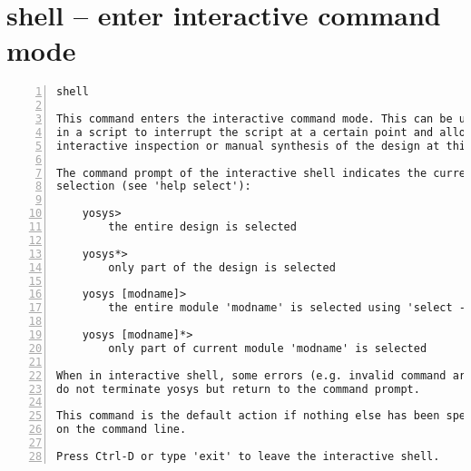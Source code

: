 \section{shell -- enter interactive command mode}
\label{cmd:shell}
\begin{lstlisting}[numbers=left,frame=single]
    shell

This command enters the interactive command mode. This can be useful
in a script to interrupt the script at a certain point and allow for
interactive inspection or manual synthesis of the design at this point.

The command prompt of the interactive shell indicates the current
selection (see 'help select'):

    yosys>
        the entire design is selected

    yosys*>
        only part of the design is selected

    yosys [modname]>
        the entire module 'modname' is selected using 'select -module modname'

    yosys [modname]*>
        only part of current module 'modname' is selected

When in interactive shell, some errors (e.g. invalid command arguments)
do not terminate yosys but return to the command prompt.

This command is the default action if nothing else has been specified
on the command line.

Press Ctrl-D or type 'exit' to leave the interactive shell.
\end{lstlisting}

